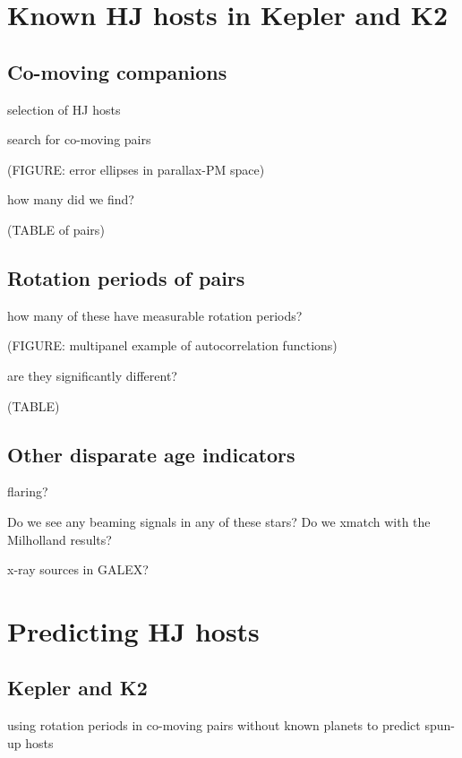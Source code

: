 \documentclass[twocolumn]{aastex62}
\begin{document}



\section{Known HJ hosts in Kepler and K2}
\subsection{Co-moving companions}

selection of HJ hosts

search for co-moving pairs

(FIGURE: error ellipses in parallax-PM space)

how many did we find?

(TABLE of pairs)

\subsection{Rotation periods of pairs}

how many of these have measurable rotation periods?

(FIGURE: multipanel example of autocorrelation functions)

are they significantly different?

(TABLE)

\subsection{Other disparate age indicators}

flaring?

Do we see any beaming signals in any of these stars? Do we xmatch with the Milholland results?

x-ray sources in GALEX?



\section{Predicting HJ hosts}
\subsection{Kepler and K2}
using rotation periods in co-moving pairs without known planets to predict spun-up hosts
\end{document}
